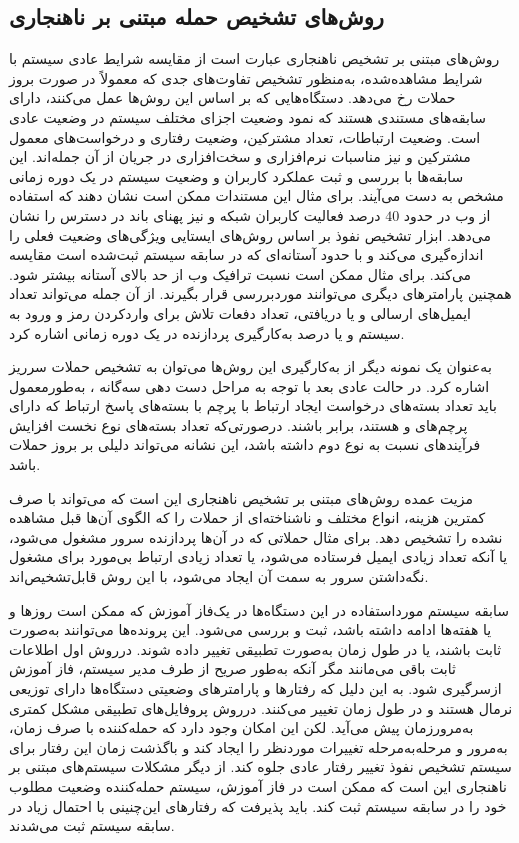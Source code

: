 \documentclass[a4paper,oneside,12pt]{report}
\begin{document}
 \subsection{روش‌های تشخیص حمله مبتنی بر ناهنجاری} 
روش‌های مبتنی بر تشخیص ناهنجاری عبارت است از مقایسه شرایط عادی سیستم با شرایط مشاهده‌شده، به‌منظور تشخیص تفاوت‌های جدی که معمولاً در صورت بروز حملات رخ می‌دهد. دستگاه‌هایی که بر اساس این روش‌ها عمل می‌کنند، دارای سابقه‌های مستندی هستند که نمود وضعیت اجزای مختلف سیستم در وضعیت عادی است. وضعیت ارتباطات، تعداد مشترکین، وضعیت رفتاری و درخواست‌های معمول مشترکین و نیز مناسبات نرم‌افزاری و سخت‌افزاری در جریان از آن جمله‌اند. این سابقه‌ها با بررسی و ثبت عملکرد کاربران و وضعیت سیستم در یک دوره زمانی مشخص به دست می‌آیند. برای مثال این مستندات ممکن است نشان دهند که استفاده از وب در حدود 
$40$
درصد فعالیت کاربران شبکه و نیز پهنای باند در دسترس را نشان می‌دهد. ابزار تشخیص نفوذ بر اساس روش‌های ایستایی ویژگی‌های وضعیت فعلی را اندازه‌گیری می‌کند و با حدود آستانه‌ای که در سابقه سیستم ثبت‌شده است مقایسه می‌کند. برای مثال ممکن است نسبت ترافیک وب از حد بالای آستانه بیشتر شود. همچنین پارامترهای دیگری می‌توانند موردبررسی قرار بگیرند. از آن جمله می‌تواند تعداد ایمیل‌های ارسالی و یا دریافتی، تعداد دفعات تلاش برای واردکردن رمز و ورود به سیستم و یا درصد به‌کارگیری پردازنده در یک دوره زمانی اشاره کرد.  

به‌عنوان یک نمونه دیگر از به‌کارگیری این روش‌ها می‌توان به تشخیص حملات سرریز اشاره کرد. در حالت عادی بعد با توجه به مراحل دست دهی سه‌گانه 
، 
به‌طورمعمول باید تعداد بسته‌های درخواست ایجاد ارتباط با پرچم 
با بسته‌های پاسخ ارتباط 
که دارای پرچم‌های 
و 
هستند، برابر باشند. درصورتی‌که تعداد بسته‌های نوع نخست افزایش فرآیندهای نسبت به نوع دوم داشته باشد، این نشانه می‌تواند دلیلی بر بروز حملات 
باشد.  

مزیت عمده روش‌های مبتنی بر تشخیص ناهنجاری این است که می‌تواند با صرف کمترین هزینه، انواع مختلف و ناشناخته‌ای از حملات را که الگوی آن‌ها قبل مشاهده نشده را تشخیص دهد. برای مثال حملاتی که در آن‌ها پردازنده سرور مشغول می‌شود، یا آنکه تعداد زیادی ایمیل فرستاده می‌شود، یا تعداد زیادی ارتباط بی‌مورد برای مشغول نگه‌داشتن سرور به سمت آن ایجاد می‌شود، با این روش قابل‌تشخیص‌اند.

سابقه سیستم مورداستفاده در این دستگاه‌ها در یک‌فاز آموزش که ممکن است روزها و یا هفته‌ها ادامه داشته باشد، ثبت و بررسی می‌شود. این پرونده‌ها می‌توانند به‌صورت ثابت باشند، یا در طول زمان به‌صورت تطبیقی تغییر داده شوند. درروش اول اطلاعات ثابت باقی می‌مانند مگر آنکه به‌طور صریح از طرف مدیر سیستم، فاز آموزش ازسرگیری شود. به این دلیل که رفتارها و پارامترهای وضعیتی دستگاه‌ها دارای توزیعی نرمال هستند و در طول زمان تغییر می‌کنند. درروش پروفایل‌های تطبیقی مشکل کمتری به‌مرورزمان پیش می‌آید. لکن این امکان وجود دارد که حمله‌کننده با صرف زمان، به‌مرور و مرحله‌به‌مرحله تغییرات موردنظر را ایجاد کند و باگذشت زمان این رفتار برای سیستم تشخیص نفوذ تغییر رفتار عادی جلوه کند. از دیگر مشکلات سیستم‌های مبتنی بر ناهنجاری این است که ممکن است در فاز آموزش، سیستم حمله‌کننده وضعیت مطلوب خود را در سابقه سیستم ثبت کند. باید پذیرفت که رفتارهای این‌چنینی با احتمال زیاد در سابقه سیستم ثبت می‌شدند.
\end{document}
